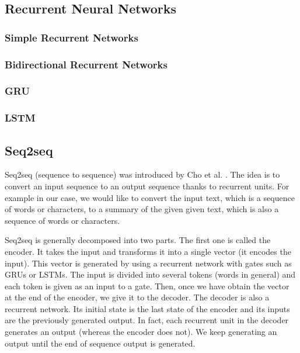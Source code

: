 \documentclass[11pt,a4paper,oldfontcommands]{memoir}
\begin{document}
\subsection{Recurrent Neural Networks}

\subsubsection{Simple Recurrent Networks}

\subsubsection{Bidirectional Recurrent Networks}

\subsubsection{GRU}

\subsubsection{LSTM}

\subsection{Seq2seq}
\label{Seq2seq}

Seq2seq (sequence to sequence) was introduced by Cho et al. \cite{DBLP:journals/corr/ChoMGBSB14}. The idea is to convert an input sequence to an output sequence thanks to recurrent units. For example in our case, we would like to convert the input text, which is a sequence of words or characters, to a summary of the given given text, which is also a sequence of words or characters.

Seq2seq is generally decomposed into two parts. The first one is called the encoder. It takes the input and transforms it into a single vector (it encodes the input). This vector is generated by using a recurrent network with gates such as GRUs or LSTMs. The input is divided into several tokens (words in general) and each token is given as an input to a gate. Then, once we have obtain the vector at the end of the encoder, we give it to the decoder. The decoder is also a recurrent network. Its initial state is the last state of the encoder and its inputs are the previously generated output. In fact, each recurrent unit in the decoder generates an output (whereas the encoder does not). We keep generating an output until the end of sequence output is generated.
\end{document}

